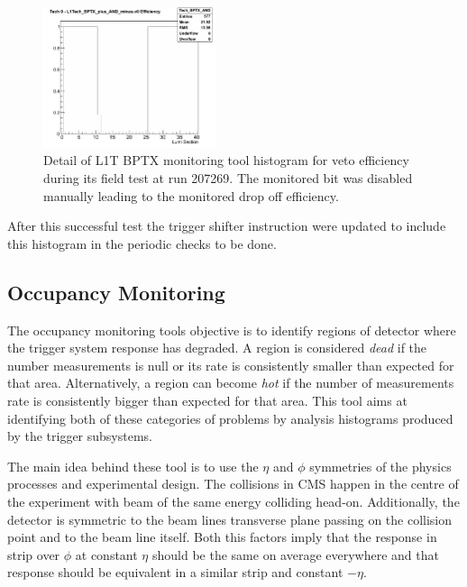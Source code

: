 \begin{figure}[!htb]
\centering
\includegraphics[width=0.45\textwidth]{Chapter03/L1TOnline/Images/L1TBPTX_Tech_BPTX_AND.png}
\caption{Detail of \gls{L1T} \gls{BPTX} monitoring tool histogram for veto efficiency during its field test at run 207269. The monitored bit was disabled manually leading to the monitored drop off efficiency.} 
\label{FIGURE:TechnicalWork_L1TBPTX_ImplementationTests}
\end{figure}

After this successful test the trigger shifter instruction were updated to include this histogram in the periodic checks to be done.  

\subsection{Occupancy Monitoring}


The occupancy monitoring tools objective is to identify regions of detector where the trigger system response has degraded. A region is considered \textit{dead} if the number measurements is null or its rate is consistently smaller than expected for that area. Alternatively, a region can become \textit{hot} if the number of measurements rate is consistently bigger than expected for that area. This tool aims at identifying both of these categories of problems by analysis histograms produced by the trigger subsystems.

The main idea behind these tool is to use the $\eta$ and $\phi$ symmetries of the physics processes and experimental design. The collisions in \gls{CMS} happen in the centre of the experiment with beam of the same energy colliding head-on. Additionally, the detector is symmetric to the beam lines transverse plane passing on the collision point and to the beam line itself. Both this factors imply that the response in strip over $\phi$ at constant $\eta$ should be the same on average everywhere and that response should be equivalent in a similar strip and constant $-\eta$.

